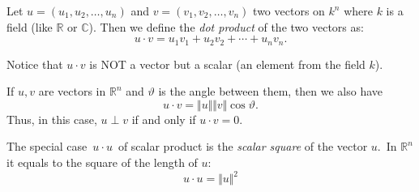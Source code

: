 \documentclass[12pt]{article}
\begin{document}
Let $u=(u_1,u_2,\ldots,u_n)$ and $v=(v_1,v_2,\ldots,v_n)$ two vectors on $k^n$ where $k$ is a field (like $\mathbb{R}$ or $\mathbb{C}$).
Then we define the \emph{dot product} of the two vectors as:
$$u\cdot v=u_1v_1+u_2v_2+\cdots+u_nv_n.$$

Notice that $u\cdot v$ is NOT a vector but a scalar (an element from the field $k$).

If $u,v$ are vectors in $\mathbb{R}^n$ and $\vartheta$ is the angle between them, then we also have
$$u\cdot v=\Vert u\Vert\Vert v\Vert \cos\vartheta.$$
Thus, in this case, $u\perp v$ if and only if $u\cdot v=0$.

The special case\, $u \cdot u$\, of scalar product is the {\em scalar square} of the vector $u$.\, In $\mathbb{R}^n$ it equals to the square of the length of $u$:
        $$u \cdot u = \Vert u \Vert^2$$
\end{document}
